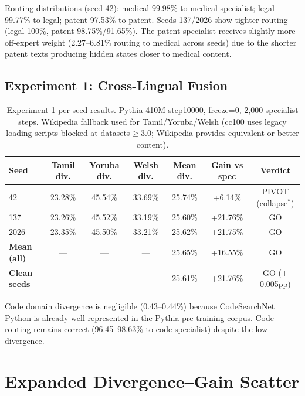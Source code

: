 \documentclass{article}
\begin{document}
Routing distributions (seed 42): medical 99.98\% to medical specialist; legal 99.77\% to legal; patent 97.53\% to patent. Seeds 137/2026 show tighter routing (legal 100\%, patent 98.75\%/91.65\%). The patent specialist receives slightly more off-expert weight (2.27--6.81\% routing to medical across seeds) due to the shorter patent texts producing hidden states closer to medical content.

\subsection{Experiment 1: Cross-Lingual Fusion}
\label{app:phase2_crosslingual}

\begin{table}[h]
\centering
\caption{Experiment 1 per-seed results. Pythia-410M step10000, freeze=0, 2,000 specialist steps. Wikipedia fallback used for Tamil/Yoruba/Welsh (cc100 uses legacy loading scripts blocked at datasets$\geq$3.0; Wikipedia provides equivalent or better content).}
\label{tab:app_phase2_crosslingual}
\small
\begin{tabular}{lcccccc}
\toprule
\textbf{Seed} & \textbf{Tamil div.} & \textbf{Yoruba div.} & \textbf{Welsh div.} & \textbf{Mean div.} & \textbf{Gain vs spec} & \textbf{Verdict} \\
\midrule
42   & 23.28\% & 45.54\% & 33.69\% & 25.74\% & +6.14\%  & PIVOT (collapse$^*$) \\
137  & 23.26\% & 45.52\% & 33.19\% & 25.60\% & +21.76\% & GO \\
2026 & 23.35\% & 45.50\% & 33.21\% & 25.62\% & +21.75\% & GO \\
\midrule
\textbf{Mean (all)} & --- & --- & --- & 25.65\% & +16.55\% & GO \\
\textbf{Clean seeds} & --- & --- & --- & 25.61\% & +21.76\% & GO ($\pm$0.005pp) \\
\bottomrule
\end{tabular}
\end{table}

Code domain divergence is negligible (0.43--0.44\%) because CodeSearchNet Python is already well-represented in the Pythia pre-training corpus. Code routing remains correct (96.45--98.63\% to code specialist) despite the low divergence.

\section{Expanded Divergence--Gain Scatter}
\label{app:scatter_v2}
\end{document}
